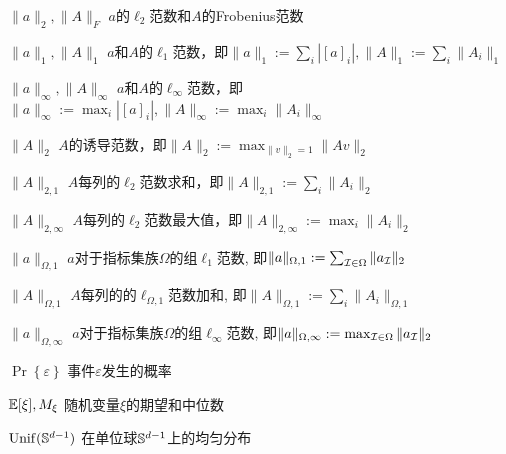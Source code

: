 \begin{denotation}
\item[\(\|a\|_2, \|A\|_F\)] \(a\)的\(\ell_2\)范数和\(A\)的Frobenius范数
\item[\(\|a\|_1, \|A\|_1\) ] \(a\)和\(A\)的\(\ell_1\)范数，即\(\|a\|_1:=\sum_i |[a]_i|, \|A\|_1:=\sum_i \|A_i\|_1\) 
\item[\(\|a\|_\infty, \|A\|_\infty\)] \(a\)和\(A\)的\(\ell_\infty\)范数，即\(\|a\|_\infty:=\max_i |[a]_i|, \|A\|_\infty:=\max_i \|A_i\|_\infty\) 
\item[\(\|A\|_2\)] \(A\)的诱导范数，即\(\|A\|_2:=\max_{\|v\|_2 = 1} \|Av\|_2\)
\item[\(\|A\|_{2,1}\) ] \(A\)每列的\(\ell_2\)范数求和，即\(\|A\|_{2,1}:=\sum_{i} \|A_i\|_2\) 
\item[\(\|A\|_{2,\infty}\) ] \(A\)每列的\(\ell_2\)范数最大值，即\(\|A\|_{2,\infty}:=\max_{i} \|A_i\|_2\) 
\item[\(\|a\|_{\Omega, 1}\) ] \(a\)对于指标集族\(\Omega\)的组\(\ell_1\)范数, 即\(\|a\|_{\Omega, 1} := \sum_{\cI \in \Omega} \|a_{\cI}\|_2\)
\item[\(\|A\|_{\Omega, 1}\) ] \(A\)每列的的\(\ell_{\Omega, 1}\)范数加和,
  即\(\|A\|_{\Omega, 1} := \sum_i \|A_i\|_{\Omega, 1}\)
\item[\(\|a\|_{\Omega, \infty}\) ] \(a\)对于指标集族\(\Omega\)的组\(\ell_\infty\)范数,
  即\(\|a\|_{\Omega, \infty} := \max_{\cI \in \Omega} \|a_{\cI}\|_2\)

\item[\(\Pr\left\{ \varepsilon \right\}\) ] 事件\(\varepsilon\)发生的概率 
\item[\(\E[\xi\char"005D, M_\xi\)] 随机变量\(\xi\)的期望和中位数 
\item[\(\Unif(\S^{d-1})\)] 在单位球\(\S^{d-1}\)上的均匀分布
\end{denotation}
